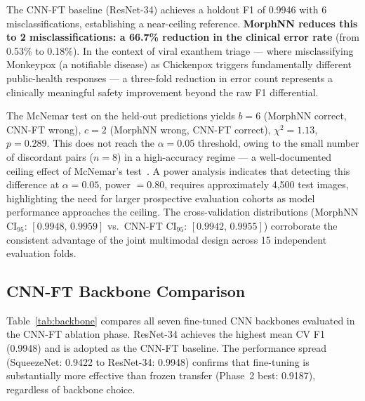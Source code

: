 \documentclass[preprint,12pt]{elsarticle}
\begin{document}
The CNN-FT baseline (ResNet-34) achieves a holdout F1 of 0.9946 with
6 misclassifications, establishing a near-ceiling reference.
\textbf{MorphNN reduces this to 2 misclassifications: a 66.7\% reduction
in the clinical error rate} (from 0.53\% to 0.18\%).  In the context of
viral exanthem triage --- where misclassifying Monkeypox (a notifiable
disease) as Chickenpox triggers fundamentally different public-health
responses --- a three-fold reduction in error count represents a
clinically meaningful safety improvement beyond the raw F1 differential.

The McNemar test on the held-out predictions yields $b = 6$ (MorphNN
correct, CNN-FT wrong), $c = 2$ (MorphNN wrong, CNN-FT correct),
$\chi^2 = 1.13$, $p = 0.289$.  This does not reach the $\alpha = 0.05$
threshold, owing to the small number of discordant pairs ($n = 8$) in a
high-accuracy regime --- a well-documented ceiling effect of McNemar's
test~\cite{dietterich1998approximate}.  A power analysis indicates that
detecting this difference at $\alpha = 0.05$, power $= 0.80$, requires
approximately 4,500 test images, highlighting the need for larger
prospective evaluation cohorts as model performance approaches the
ceiling.  The cross-validation distributions (MorphNN CI$_{\text{95}}$:
$[\text{0.9948, 0.9959}]$ vs.\ CNN-FT CI$_{\text{95}}$:
$[\text{0.9942, 0.9955}]$) corroborate the consistent advantage of the
joint multimodal design across 15 independent evaluation folds.


\subsection{CNN-FT Backbone Comparison}
\label{sec:backbone}

Table~\ref{tab:backbone} compares all seven fine-tuned CNN backbones
evaluated in the CNN-FT ablation phase.  ResNet-34 achieves the highest
mean CV F1 (0.9948) and is adopted as the CNN-FT baseline.  The
performance spread (SqueezeNet: 0.9422 to ResNet-34: 0.9948) confirms
that fine-tuning is substantially more effective than frozen transfer
(Phase~2 best: 0.9187), regardless of backbone choice.
\end{document}
